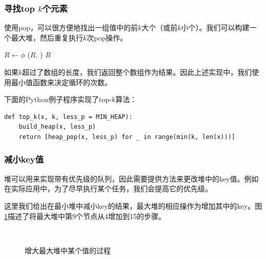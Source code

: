 \documentclass[b5paper]{ctexart}
\begin{document}
\subsubsection{寻找top $k$个元素}

使用pop，可以很方便地找出一组值中的前$k$大个（或前$k$小个）。我们可以构建一个最大堆，然后重复执行$k$次pop操作。

\begin{algorithmic}[1]
  \State $R \gets \phi$
  \State {}
    \State {}($R$, )
  \EndFor
  \State \Return $R$
\EndFunction
\end{algorithmic}

如果$k$超过了数组的长度，我们返回整个数组作为结果。因此上述实现中，我们使用最小值函数来决定循环的次数。

下面的Python例子程序实现了top-$k$算法：

\lstset{language=Python}
\begin{lstlisting}
def top_k(x, k, less_p = MIN_HEAP):
    build_heap(x, less_p)
    return [heap_pop(x, less_p) for _ in range(min(k, len(x)))]
\end{lstlisting}

\subsubsection{减小key值}

堆可以用来实现带有优先级的队列，因此需要提供方法来更改堆中的key值。例如在实际应用中，为了尽早执行某个任务，我们会提高它的优先级。

这里我们给出在最小堆中减小key的结果，最大堆的相应操作为增加其中的key。图\ref{fig:decrease-key-2}描述了将最大堆中第9个节点从4增加到15的步骤。

\captionsetup[subfigure]{labelformat=empty, margin=10pt}
\begin{figure}[htbp]
    \centering
     \\
    \caption{增大最大堆中某个值的过程} \label{fig:decrease-key-2}
\end{figure}
\captionsetup[subfigure]{labelformat=parens}
\end{document}
